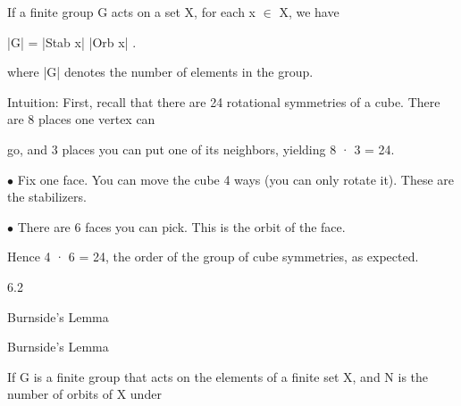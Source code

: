 \documentclass[a4paper,portrait,12pt]{article}
\begin{document}
\begin{flushleft}
If a finite group G acts on a set X, for each x $\in$ X, we have
\end{flushleft}


\begin{flushleft}
|G| = |Stab x| |Orb x| .
\end{flushleft}


\begin{flushleft}
where |G| denotes the number of elements in the group.
\end{flushleft}


\begin{flushleft}
Intuition: First, recall that there are 24 rotational symmetries of a cube. There are 8 places one vertex can
\end{flushleft}


\begin{flushleft}
go, and 3 places you can put one of its neighbors, yielding 8 · 3 = 24.
\end{flushleft}


\begin{flushleft}
$\bullet$ Fix one face. You can move the cube 4 ways (you can only rotate it). These are the stabilizers.
\end{flushleft}


\begin{flushleft}
$\bullet$ There are 6 faces you can pick. This is the orbit of the face.
\end{flushleft}


\begin{flushleft}
Hence 4 · 6 = 24, the order of the group of cube symmetries, as expected.
\end{flushleft}





6.2





\begin{flushleft}
Burnside's Lemma
\end{flushleft}





\begin{flushleft}
Burnside's Lemma
\end{flushleft}


\begin{flushleft}
If G is a finite group that acts on the elements of a finite set X, and N is the number of orbits of X under
\end{flushleft}
\end{document}
